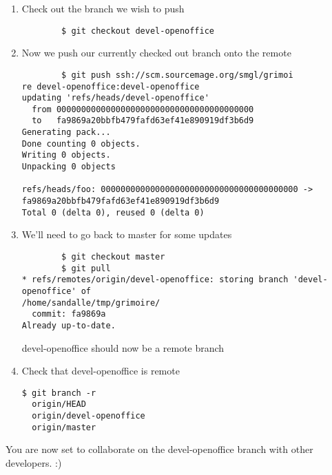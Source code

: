 \documentclass[a4paper,10pt]{book}
\begin{document}
\begin{enumerate}
	\item Check out the branch we wish to push
	\begin{verbatim}
		$ git checkout devel-openoffice
	\end{verbatim}
	\item Now we push our currently checked out branch onto the remote
	\begin{verbatim}
		$ git push ssh://scm.sourcemage.org/smgl/grimoi
re devel-openoffice:devel-openoffice
updating 'refs/heads/devel-openoffice'
  from 0000000000000000000000000000000000000000
  to   fa9869a20bbfb479fafd63ef41e890919df3b6d9
Generating pack...
Done counting 0 objects.
Writing 0 objects.
Unpacking 0 objects

refs/heads/foo: 0000000000000000000000000000000000000000 ->
fa9869a20bbfb479fafd63ef41e890919df3b6d9
Total 0 (delta 0), reused 0 (delta 0)
	\end{verbatim}
	\item We'll need to go back to master for some updates
	\begin{verbatim}
		$ git checkout master
		$ git pull
* refs/remotes/origin/devel-openoffice: storing branch 'devel-openoffice' of
/home/sandalle/tmp/grimoire/
  commit: fa9869a
Already up-to-date.
	\end{verbatim}
devel-openoffice should now be a remote branch
	\item Check that devel-openoffice is remote
	\begin{verbatim}
$ git branch -r
  origin/HEAD
  origin/devel-openoffice
  origin/master
	\end{verbatim}
\end{enumerate}
You are now set to collaborate on the devel-openoffice branch with other
developers. :)
\end{document}

